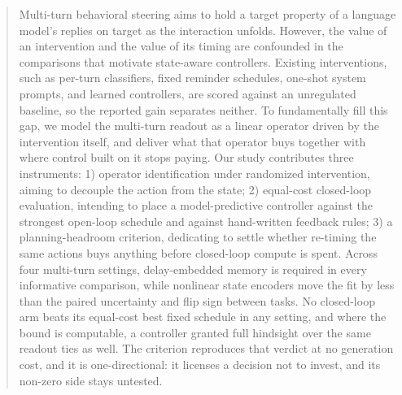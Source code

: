 \begin{abstract}
Multi-turn behavioral steering aims to hold a target property of a language model's replies
on target as the interaction unfolds.
However, the value of an intervention and the value of its timing are confounded in the
comparisons that motivate state-aware controllers.
Existing interventions, such as per-turn classifiers, fixed reminder schedules, one-shot
system prompts, and learned controllers, are scored against an unregulated baseline, so the
reported gain separates neither.
To fundamentally fill this gap, we model the multi-turn readout as a linear operator driven
by the intervention itself, and deliver what that operator buys together with where control
built on it stops paying.
Our study contributes three instruments: 1) operator identification under randomized
intervention, aiming to decouple the action from the state; 2) equal-cost closed-loop
evaluation, intending to place a model-predictive controller against the strongest open-loop
schedule and against hand-written feedback rules; 3) a planning-headroom criterion,
dedicating to settle whether re-timing the same actions buys anything before closed-loop
compute is spent.
Across four multi-turn settings, delay-embedded memory is required in every informative
comparison, while nonlinear state encoders move the fit by less than the paired uncertainty
and flip sign between tasks.
No closed-loop arm beats its equal-cost best fixed schedule in any setting, and where the
bound is computable, a controller granted full hindsight over the same readout ties as well.
The criterion reproduces that verdict at no generation cost, and it is one-directional: it
licenses a decision not to invest, and its non-zero side stays untested.
\end{abstract}
